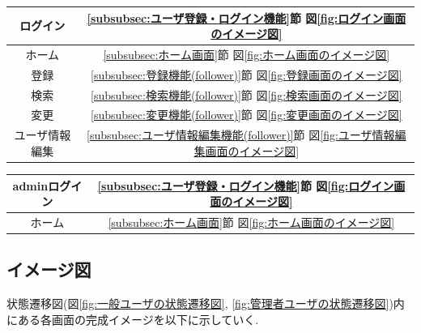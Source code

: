 \documentclass[11ptm]{jsarticle}
\begin{document}
\begin{minipage}[t]{0.5\linewidth}
  \vspace{1zh}
  \begin{center}
    \begin{tabular}{c|c}
      ログイン       & \ref{subsubsec:ユーザ登録・ログイン機能}節 図\ref{fig:ログイン画面のイメージ図}           \\
      \hline
      ホーム         & \ref{subsubsec:ホーム画面}節 図\ref{fig:ホーム画面のイメージ図}                           \\
      \hline
      登録           & \ref{subsubsec:登録機能(follower)}節 図\ref{fig:登録画面のイメージ図}                     \\
      \hline
      検索           & \ref{subsubsec:検索機能(follower)}節 図\ref{fig:検索画面のイメージ図}                     \\
      \hline
      変更           & \ref{subsubsec:変更機能(follower)}節 図\ref{fig:変更画面のイメージ図}                     \\
      \hline
      ユーザ情報編集 & \ref{subsubsec:ユーザ情報編集機能(follower)}節 図\ref{fig:ユーザ情報編集画面のイメージ図} \\
    \end{tabular}
  \end{center}
\end{minipage}
%
\hfill
%
\begin{minipage}[t]{0.5\linewidth}
  \vspace{1zh}
  \begin{center}
    \begin{tabular}{c|c}
      adminログイン & \ref{subsubsec:ユーザ登録・ログイン機能}節 図\ref{fig:ログイン画面のイメージ図} \\
      \hline
      ホーム        & \ref{subsubsec:ホーム画面}節 図\ref{fig:ホーム画面のイメージ図}                 \\
    \end{tabular}
  \end{center}
\end{minipage}

\clearpage
\subsection{イメージ図}
\label{sec:イメージ図}
状態遷移図(図\ref{fig:一般ユーザの状態遷移図}, \ref{fig:管理者ユーザの状態遷移図})内にある各画面の完成イメージを以下に示していく.

\end{document}
